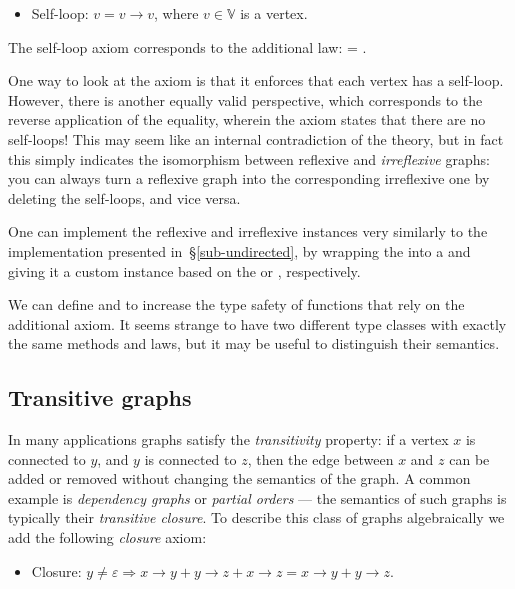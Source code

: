 \begin{itemize}
    \item Self-loop: $v = v \rightarrow v$, where $v\in \mathbb{V}$ is a vertex.
\end{itemize}

\noindent
The self-loop axiom corresponds to the additional  law:
 = .

One way to look at the axiom is that it enforces that each vertex has a self-loop. However,
there is another equally valid perspective, which corresponds to the reverse application
of the equality, wherein the axiom states that there are no self-loops! This may seem like an
internal contradiction of the theory, but in fact this simply indicates the isomorphism
between reflexive and \emph{irreflexive} graphs: you can always
turn a reflexive graph into the corresponding irreflexive one by deleting the self-loops,
and vice versa.

One can implement the reflexive and irreflexive  instances very similarly to
the  implementation presented in~\S\ref{sub-undirected}, by wrapping the
 into a  and giving it a custom  instance based on the
 or , respectively.

We can define
 and
to increase the type safety of functions that rely on the additional axiom. It seems
strange to have two different type classes with exactly the same methods and laws, but
it may be useful to distinguish their semantics.

\subsection{Transitive graphs}\label{sub-transitive}

In many applications graphs satisfy the \emph{transitivity} property: if a vertex $x$ is
connected to $y$, and $y$ is connected to $z$, then the edge between $x$ and $z$ can be
added or removed without changing the semantics of the graph. A common example is
\emph{dependency graphs} or \emph{partial orders} --- the semantics of such graphs is
typically their \emph{transitive closure}.
To describe this class of graphs algebraically we add the following \emph{closure} axiom:

\begin{itemize}
    \item Closure: $y \neq \varepsilon \Rightarrow x \rightarrow y + y \rightarrow z +
    x \rightarrow z = x \rightarrow y + y \rightarrow z$.
\end{itemize}


